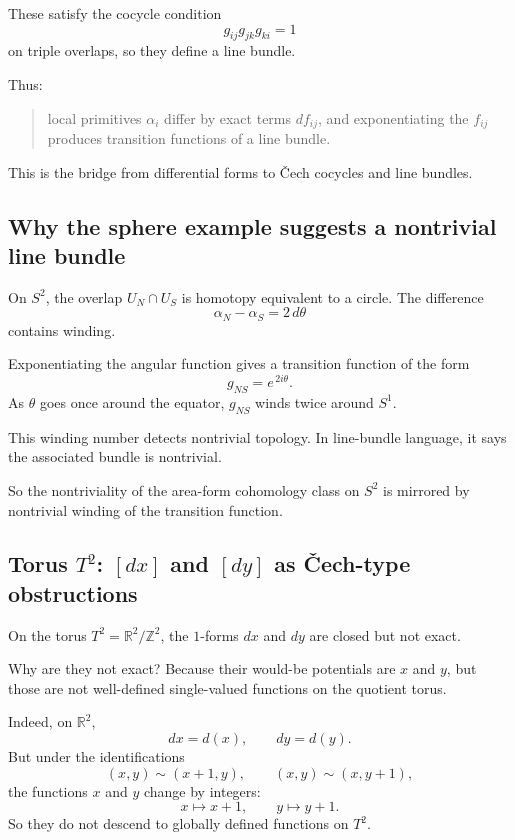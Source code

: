 \documentclass[11pt]{article}
\begin{document}
	These satisfy the cocycle condition
	\[
	g_{ij}g_{jk}g_{ki}=1
	\]
	on triple overlaps, so they define a line bundle.
	
	Thus:
	
	\begin{quote}
		local primitives \(\alpha_i\) differ by exact terms \(df_{ij}\), and exponentiating the \(f_{ij}\) produces transition functions of a line bundle.
	\end{quote}
	
	This is the bridge from differential forms to \v{C}ech cocycles and line bundles.
	
	\subsection*{Why the sphere example suggests a nontrivial line bundle}
	
	On \(S^2\), the overlap \(U_N\cap U_S\) is homotopy equivalent to a circle. The difference
	\[
	\alpha_N-\alpha_S=2\,d\theta
	\]
	contains winding.
	
	Exponentiating the angular function gives a transition function of the form
	\[
	g_{NS}=e^{\,2i\theta}.
	\]
	As \(\theta\) goes once around the equator, \(g_{NS}\) winds twice around \(S^1\).
	
	This winding number detects nontrivial topology. In line-bundle language, it says the associated bundle is nontrivial.
	
	So the nontriviality of the area-form cohomology class on \(S^2\) is mirrored by nontrivial winding of the transition function.
	
	\subsection*{Torus \(T^2\): \([dx]\) and \([dy]\) as \v{C}ech-type obstructions}
	
	On the torus \(T^2=\mathbb{R}^2/\mathbb{Z}^2\), the \(1\)-forms \(dx\) and \(dy\) are closed but not exact.
	
	Why are they not exact? Because their would-be potentials are \(x\) and \(y\), but those are not well-defined single-valued functions on the quotient torus.
	
	Indeed, on \(\mathbb{R}^2\),
	\[
	dx=d(x),\qquad dy=d(y).
	\]
	But under the identifications
	\[
	(x,y)\sim(x+1,y),\qquad (x,y)\sim(x,y+1),
	\]
	the functions \(x\) and \(y\) change by integers:
	\[
	x\mapsto x+1,\qquad y\mapsto y+1.
	\]
	So they do not descend to globally defined functions on \(T^2\).
	
\end{document}
